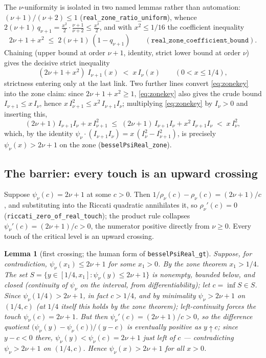 \documentclass[11pt]{article}
\newtheorem{lemma}[theorem]{Lemma}
\newcommand{\lean}[1]{\texttt{#1}}
\begin{document}
The $\nu$-uniformity is isolated in two named lemmas rather than
automation: $(\nu+1)/(\nu+2) \le 1$
(\lean{real\_zone\_ratio\_uniform}), whence
$2(\nu+1)\,q_{\nu+1} = \tfrac{x^2}{2}\cdot\tfrac{\nu+1}{\nu+2}
\le \tfrac{x^2}{2}$, and with $x^2 \le 1/16$ the coefficient
inequality
\[
2\nu+1+x^2 \;\le\; 2(\nu+1)\,(1-q_{\nu+1})
\qquad (\lean{real\_zone\_coefficient\_bound}).
\]
Chaining (upper bound at order $\nu+1$, identity, strict lower bound
at order $\nu$) gives the decisive strict inequality
\begin{equation}\label{eq:zonekey}
(2\nu+1+x^2)\; I_{\nu+1}(x) \;<\; x\, I_\nu(x)
\qquad (0 < x \le 1/4),
\end{equation}
strictness entering only at the last link.  Two further lines
convert \eqref{eq:zonekey} into the zone claim: since
$2\nu+1+x^2 \ge 1$, \eqref{eq:zonekey} also gives the crude bound
$I_{\nu+1} \le x\,I_\nu$, hence
$x\,I_{\nu+1}^2 \le x^2\,I_{\nu+1}I_\nu$; multiplying
\eqref{eq:zonekey} by $I_\nu > 0$ and inserting this,
\[
(2\nu+1)\,I_{\nu+1}I_\nu + x\,I_{\nu+1}^2 \;\le\;
(2\nu+1)\,I_{\nu+1}I_\nu + x^2\,I_{\nu+1}I_\nu \;<\; x\,I_\nu^2,
\]
which, by the identity
$\psi_\nu \cdot (I_{\nu+1} I_\nu) = x\,(I_\nu^2 - I_{\nu+1}^2)$, is
precisely $\psi_\nu(x) > 2\nu+1$ on the zone
(\lean{besselPsiReal\_zone}).

\subsection{The barrier: every touch is an upward
crossing}\label{sec:barrier}

Suppose $\psi_\nu(c) = 2\nu+1$ at some $c > 0$.  Then
$1/\rho_\nu(c) - \rho_\nu(c) = (2\nu+1)/c$, and substituting into
the Riccati quadratic annihilates it, so $\rho_\nu'(c) = 0$
(\lean{riccati\_zero\_of\_real\_touch}); the product rule collapses
$\psi_\nu'(c) = (2\nu+1)/c > 0$, the numerator positive directly
from $\nu \ge 0$.  Every touch of the critical level is an upward
crossing.

\begin{lemma}[first crossing; the human form of
\lean{besselPsiReal\_gt}]\label{lem:crossing}
Suppose, for contradiction, $\psi_\nu(x_1) \le 2\nu+1$ for some
$x_1 > 0$.  By the zone theorem $x_1 > 1/4$.  The set
$S = \{y \in [1/4, x_1] : \psi_\nu(y) \le 2\nu+1\}$ is nonempty,
bounded below, and closed (continuity of $\psi_\nu$ on the interval,
from differentiability); let $c = \inf S \in S$.  Since
$\psi_\nu(1/4) > 2\nu+1$, in fact $c > 1/4$, and by minimality
$\psi_\nu > 2\nu+1$ on $(1/4, c)$ (at $1/4$ itself this holds by the
zone theorem); left-continuity forces the touch
$\psi_\nu(c) = 2\nu+1$.  But then $\psi_\nu'(c) = (2\nu+1)/c > 0$,
so the difference quotient
$\bigl(\psi_\nu(y) - \psi_\nu(c)\bigr)/(y-c)$ is eventually positive
as $y \uparrow c$; since $y - c < 0$ there,
$\psi_\nu(y) < \psi_\nu(c) = 2\nu+1$ just left of $c$ ---
contradicting $\psi_\nu > 2\nu+1$ on $(1/4, c)$.  Hence
$\psi_\nu(x) > 2\nu+1$ for all $x > 0$.
\end{lemma}
\end{document}
